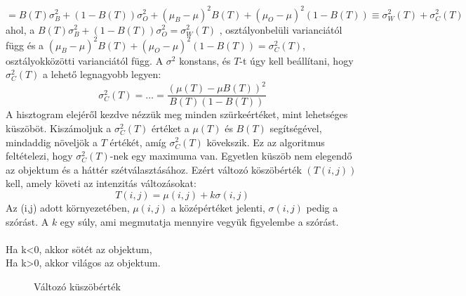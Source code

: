 $$=B(T)\sigma_B^2+(1-B(T))\sigma_O^2 + (\mu_B-\mu)^2B(T)+(\mu_O-\mu)^2(1-B(T)) \equiv \sigma^2_W(T)+\sigma^2_C(T)$$
ahol, a $B(T)\sigma_B^2+(1-B(T))\sigma_O^2 = \sigma^2_W(T)$ , osztályonbelüli varianciától függ és a $(\mu_B-\mu)^2B(T)+(\mu_O-\mu)^2(1-B(T)) = \sigma^2_C(T)$, osztályokközötti varianciától függ. A $\sigma^2$ konstans, és $T$-t úgy kell beállítani, hogy $\sigma_C^2(T)$ a lehető legnagyobb legyen:
$$\sigma^2_C(T)=\dots=\frac{(\mu(T)-\mu B(T))^2}{B(T)(1-B(T))}$$
A hisztogram elejéről kezdve nézzük meg minden szürkeértéket, mint lehetséges küszöböt. Kiszámoljuk a $\sigma^2_C(T)$ értéket a $\mu(T)$ és $B(T)$  segítségével, mindaddig növeljök a $T$ értékét, amíg $\sigma^2_C(T)$ kövekszik. Ez az algoritmus feltételezi, hogy $\sigma^2_C(T)$-nek egy maximuma van.
Egyetlen küszöb nem elegendő az objektum és a háttér szétválasztásához. Ezért változó köszöbérték $(T(i,j))$ kell, amely követi az intenzitás változásokat:
$$T(i,j)=\mu(i,j)+k\sigma(i,j)$$
Az (i,j) adott környezetében, $\mu(i,j)$ a középértéket jelenti, $\sigma(i,j)$ pedig a szórást. A $k$ egy súly, ami megmutatja mennyire vegyük figyelembe a szórást.\\\\
Ha k<0, akkor sötét az objektum,\\
Ha k>0, akkor világos az objektum.
\begin{figure}[ht]
\centering
{}
\caption{Változó küszöbérték} 
\label{fig: niblack}
\end{figure}

